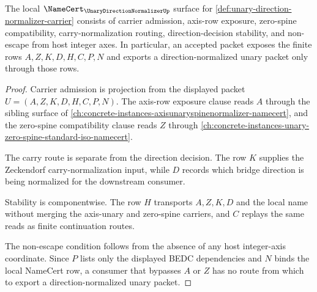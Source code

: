 \begin{theorem}
\label{thm:unary-direction-normalizer-namecert-obligations}
The local $\NameCert_{\UnaryDirectionNormalizerUp}$ surface for \autoref{def:unary-direction-normalizer-carrier} consists of carrier admission, axis-row exposure, zero-spine compatibility, carry-normalization routing, direction-decision stability, and non-escape from host integer axes. In particular, an accepted packet exposes the finite rows $A,Z,K,D,H,C,P,N$ and exports a direction-normalized unary packet only through those rows.
\end{theorem}
\begin{proof}
Carrier admission is projection from the displayed packet $U=(A,Z,K,D,H,C,P,N)$. The axis-row exposure clause reads $A$ through the sibling surface of \autoref{ch:concrete-instances-axisunaryspinenormalizer-namecert}, and the zero-spine compatibility clause reads $Z$ through \autoref{ch:concrete-instances-unary-zero-spine-standard-iso-namecert}.

The carry route is separate from the direction decision. The row $K$ supplies the Zeckendorf carry-normalization input, while $D$ records which bridge direction is being normalized for the downstream consumer.

Stability is componentwise. The row $H$ transports $A,Z,K,D$ and the local name without merging the axis-unary and zero-spine carriers, and $C$ replays the same reads as finite continuation routes.

The non-escape condition follows from the absence of any host integer-axis coordinate. Since $P$ lists only the displayed BEDC dependencies and $N$ binds the local NameCert row, a consumer that bypasses $A$ or $Z$ has no route from which to export a direction-normalized unary packet.
\end{proof}


